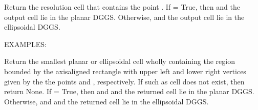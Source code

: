 \documentclass[a4paper,12ptopenany,oneside,english]{sphinxmanual}
\begin{document}
\begin{fulllineitems}
\begin{fulllineitems}
\end{fulllineitems}


\begin{fulllineitems}
\label{\detokenize{dggs:rhealpixdggs.dggs.RHEALPixDGGS.cell_from_point}}
\pysigstartsignatures
{}
\pysigstopsignatures
\sphinxAtStartPar
Return the resolution  cell that contains the point .
If  = True, then  and the output cell lie in the
planar DGGS.
Otherwise,  and the output cell lie in the ellipsoidal DGGS.

\sphinxAtStartPar
EXAMPLES:

\begin{sphinxVerbatim}[commandchars=\\\{\}]
  
   
   
\end{sphinxVerbatim}

\end{fulllineitems}


\begin{fulllineitems}
\label{\detokenize{dggs:rhealpixdggs.dggs.RHEALPixDGGS.cell_from_region}}
\pysigstartsignatures
{}
\pysigstopsignatures
\sphinxAtStartPar
Return the smallest planar or ellipsoidal cell wholly containing
the region bounded by the axis\sphinxhyphen{}aligned rectangle with upper left
and lower right vertices given by the the points  and ,
respectively.
If such as cell does not exist, then return None.
If  = True, then  and  and the returned cell
lie in the planar DGGS.
Otherwise,  and  and the returned cell lie in the ellipsoidal
DGGS.


\end{fulllineitems}
\end{fulllineitems}
\end{document}
